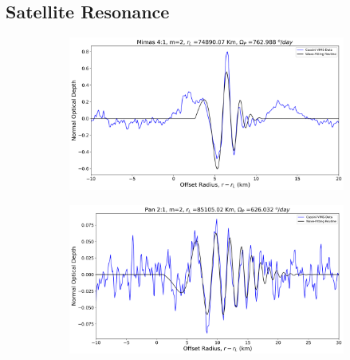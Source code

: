 \documentclass{article}
\begin{document}
\subsection{Satellite Resonance}
\label{subsec:data}
\begin{figure}[h]
    \centering

    \begin{subfigure}{0.35\linewidth}
        \includegraphics[width=\linewidth]{mimas41_wavefit.png}
        \label{fig:mimas41}
    \end{subfigure}
    \hspace{1\linewidth} %

    \begin{subfigure}{0.35\linewidth}
        \includegraphics[width=\linewidth]{pan_21_wavefit.png}
        \label{fig:pan21}
    \end{subfigure}
    \hspace{1\linewidth}


\end{figure}
\end{document}
